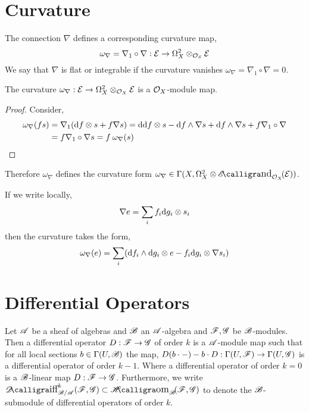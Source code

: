 \documentclass[12pt]{article}
\begin{document}
\section{Curvature}

\begin{definition}
The connection $\nabla$ defines a corresponding curvature map,
\[ \omega_\nabla = \nabla_1 \circ \nabla : \mathcal{E} \to \Omega^2_X \otimes_{\mathcal{O}_{S}} \mathcal{E} \]
We say that $\nabla$ is flat or integrable if the curvature vanishes $\omega_\nabla = \nabla_1 \circ \nabla = 0$.
\end{definition}

\begin{lemma}
The curvature $\omega_\nabla : \mathcal{E} \to \Omega^2_X \otimes_{\mathcal{O}_{X}} \mathcal{E}$ is a $\mathcal{O}_{X}$-module map.
\end{lemma}

\begin{proof}
Consider,
\begin{align*}
\omega_\nabla(f s) & = \nabla_1 (\mathrm{d}{f} \otimes s + f \nabla s) = \mathrm{d}{\mathrm{d}{f}} \otimes s - \mathrm{d}{f} \wedge \nabla s + \mathrm{d}{f} \wedge \nabla s + f \nabla_1 \circ \nabla 
\\
& = f \nabla_1 \circ \nabla s = f \: \omega_\nabla (s) 
\end{align*} 
\end{proof}

\begin{rmk}
Therefore $\omega_\nabla$ defines the curvature form $\omega_\nabla \in \Gamma(X, \Omega_X^2 \otimes \shEnd{\struct{X}}{\E})$.
\end{rmk}



\begin{remark}
If we write locally,
\[ \nabla e = \sum_i f_i \mathrm{d}{g_i} \otimes s_i \]
then the curvature takes the form,
\[ \omega_\nabla (e) = \sum_{i} (\mathrm{d}{f_i} \wedge \mathrm{d}{g_i} \otimes e - f_i \mathrm{d}{g_i} \otimes \nabla s_i) \]
\end{remark} 

\section{Differential Operators}

\begin{defn}
Let $\mathscr{A}$ be a sheaf of algebras and $\mathscr{B}$ an $\mathscr{A}$-algebra and $\mathscr{F}, \mathscr{G}$ be $\mathscr{B}$-modules. Then a differential operator $D : \mathscr{F} \to \mathscr{G}$ of order $k$ is a $\mathscr{A}$-module map such that for all local sections $b \in \Gamma(U, \mathscr{B})$ the map, $D(b \cdot -) - b \cdot D : \Gamma(U, \mathscr{F}) \to \Gamma(U, \mathscr{G})$ is a differential operator of order $k - 1$. Where a differential operator of order $k = 0$ is a $\mathscr{B}$-linear map $D : \mathscr{F} \to \mathscr{G}$. Furthermore, we write $\shDiff{k}{\sB/\sA}{\F}{\G} \subset \shHom{\sB}{\F}{\G}$ to denote the $\mathscr{B}$-submodule of differential operators of order $k$.
\end{defn}
\end{document}
